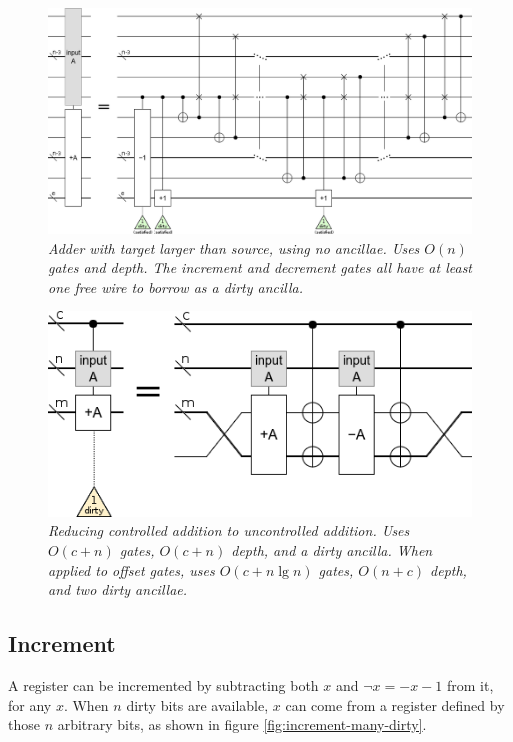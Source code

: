 \documentclass[twocolumn]{article}
\begin{document}
\begin{figure}
  \centering
  \includegraphics[width=\linewidth]{assets/inline-adder-into-large.png}
  \caption{\em
      Adder with target larger than source, using no ancillae.
      Uses $O(n)$ gates and depth.
      The increment and decrement gates all have at least one free wire to borrow as a dirty ancilla.
  }
  \label{fig:inline-adder-into-large}
\end{figure}

\begin{figure}
  \centering
  \includegraphics[width=\linewidth]{assets/controlled-addition.png}
  \caption{\em
  	Reducing controlled addition to uncontrolled addition.
  	Uses $O(c + n)$ gates, $O(c + n)$ depth, and a dirty ancilla.
  	When applied to offset gates, uses $O(c + n \lg n)$ gates, $O(n + c)$ depth, and two dirty ancillae.
  }
  \label{fig:controlled-addition}
\end{figure}


\subsection{Increment}

A register can be incremented by subtracting both $x$ and $\neg x = -x-1$ from it, for any $x$.
When $n$ dirty bits are available, $x$ can come from a register defined by those $n$ arbitrary bits, as shown in figure \ref{fig:increment-many-dirty}.
\end{document}
